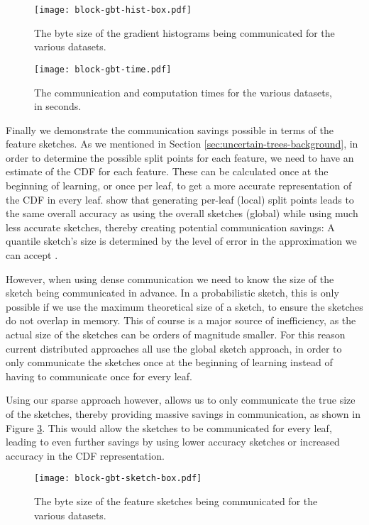 \begin{figure}
	\centering
	\texttt{[image: block-gbt-hist-box.pdf]}
	\vspace{-10pt}
	\caption{The byte size of the gradient histograms being communicated for the various datasets.}
	\label{fig:block-gbt-hist-size}
\end{figure}

\begin{figure}
	\centering
	\texttt{[image: block-gbt-time.pdf]}
	\vspace{-10pt}
	\caption{The communication and computation times for the various datasets, in seconds.}
	\label{fig:block-gbt-time}
\end{figure}


Finally we demonstrate the communication savings possible in terms of the feature sketches. As we mentioned in Section \ref{sec:uncertain-trees-background}, in order to determine the possible
split points for each feature, we need to have an estimate of the CDF for each feature. These
can be calculated once at the beginning of learning, or once per leaf, to get a more accurate representation
of the CDF in every leaf. \citet{xgboost} show that generating per-leaf (local) split points leads to the same overall
accuracy as using the overall sketches (global) while using much less accurate sketches, thereby creating potential communication savings:
A quantile sketch's size is determined by the level of error in the approximation we can
accept \cite{karnin2016kll}.

However, when using dense communication we need to know the size
of the sketch being communicated in advance. In a probabilistic sketch, this is only possible
if we use the maximum theoretical size of a sketch, to ensure the sketches do not overlap in memory.
This of course is a major source of inefficiency, as the actual size of the sketches can be orders
of magnitude smaller. For this reason
current distributed approaches all use the global sketch approach, in order to only communicate
the sketches once at the beginning of learning instead of having to communicate once for every
leaf.

Using our sparse approach however, allows us to only communicate the true size of the sketches,
thereby providing massive savings in communication, as shown in Figure \ref{fig:block-gbt-sketch-size}. This would allow the sketches to be communicated for every
leaf, leading to even further savings by using lower accuracy sketches or increased accuracy
in the CDF representation.

\begin{figure}
	\centering
	\texttt{[image: block-gbt-sketch-box.pdf]}
	\vspace{-10pt}
	\caption{The byte size of the feature sketches being communicated for the various datasets.}
	\label{fig:block-gbt-sketch-size}
\end{figure}